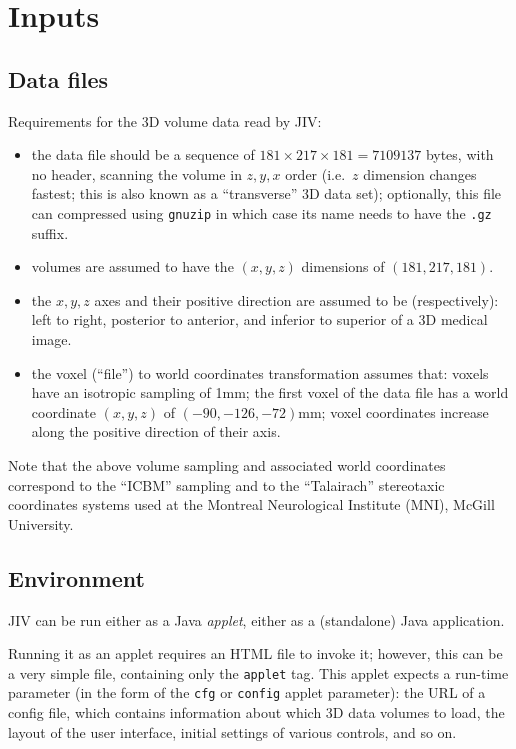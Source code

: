 %
%
%

\section{Inputs}
\label{sec:inputs}


\subsection{Data files}
\label{sec:data-files}
Requirements for the 3D volume data read by JIV:
\begin{itemize}
\item the data file should be a sequence of $181 \times 217 \times 181
  = 7109137$ bytes, with no header, scanning the volume in $z, y, x$
  order (i.e.\ $z$ dimension changes fastest; this is also known as a
  ``transverse'' 3D data set); optionally, this file can compressed
  using \texttt{gnuzip} in which case its name needs to have the
  \texttt{.gz} suffix.
\item volumes are assumed to have the $(x,y,z)$ dimensions of
  $(181,217,181)$.
\item the $x, y, z$ axes and their positive direction are assumed to
  be (respectively): left to right, posterior to anterior, and
  inferior to superior of a 3D medical image.
\item the voxel (``file'') to world coordinates transformation assumes
  that: voxels have an isotropic sampling of 1mm; the first voxel of
  the data file has a world coordinate $(x,y,z)$ of
  \mbox{$(-90,-126,-72)$mm}; voxel coordinates increase along the
  positive direction of their axis.
\end{itemize}

Note that the above volume sampling and associated world coordinates
correspond to the ``ICBM'' sampling and to the ``Talairach''
stereotaxic coordinates systems used at the Montreal Neurological
Institute (MNI), McGill University.


\subsection{Environment}
\label{sec:environment}

JIV can be run either as a Java {\em applet}, either as a (standalone)
Java application. 

Running it as an applet requires an HTML file to invoke it; however,
this can be a very simple file, containing only the \verb+applet+ tag.
This applet expects a run-time parameter (in the form of the
\verb+cfg+ or \verb+config+ applet parameter): the URL of a config
file, which contains information about which 3D data volumes to load,
the layout of the user interface, initial settings of various
controls, and so on.

